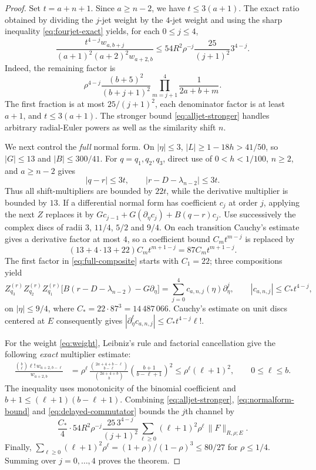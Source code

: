 \begin{proof}
Set $t=a+n+1$. Since $a\ge n-2$, we have
$t\le3(a+1)$. The exact ratio obtained by dividing the $j$-jet
weight by the $4$-jet weight and using the sharp inequality
\eqref{eq:fourjet-exact} yields, for each $0\le j\le4$,
\begin{equation}\label{eq:alljet-stronger}
 \frac{t^{4-j}w_{a,b+j}}{(a+1)^2(a+2)^2w_{a+2,b}}
 \le54R^2\rho^{-j}\frac{25}{(j+1)^2}3^{4-j}.
\end{equation}
Indeed, the remaining factor is
\[
 \rho^{4-j}\frac{(b+5)^2}{(b+j+1)^2}
 \prod_{m=j+1}^{4}\frac1{2a+b+m}.
\]
The first fraction is at most $25/(j+1)^2$, each denominator
factor is at least $a+1$, and $t\le3(a+1)$.
The stronger bound \eqref{eq:alljet-stronger} handles arbitrary
radial-Euler powers as well as the similarity shift $n$.

We next control the \emph{full} normal form. On $|\eta|\le3$,
$|L|\ge1-18h>41/50$, so $|G|\le13$ and $|B|\le300/41$.
For $q=q_1,q_2,q_3$, direct use of $0<h<1/100$,
$n\ge2$, and $a\ge n-2$ gives
\[
 |q-r|\le3t,\qquad |r-D-\lambda_{n-2}|\le3t.
\]
Thus all shift-multipliers are bounded by $22t$, while the
derivative multiplier is bounded by $13$. If a differential
normal form has coefficient $c_j$ at order $j$, applying the
next $Z$ replaces it by
$Gc_{j-1}+G(\partial_\eta c_j)+B(q-r)c_j$.
Use successively the complex discs of radii
$3$, $11/4$, $5/2$ and $9/4$.
On each transition Cauchy's estimate gives a derivative factor
at most $4$, so a coefficient bound $C_m t^{m-j}$
is replaced by
\[
 (13+4\cdot13+22)C_m t^{m+1-j}
 =87C_m t^{m+1-j}.
\]
The first factor in \eqref{eq:full-composite} starts with
$C_1=22$; three compositions yield
\begin{equation}\label{eq:normalform-bound}
 Z_{q_3}^{(r)}Z_{q_2}^{(r)}Z_{q_1}^{(r)}
 \bigl[B(r-D-\lambda_{n-2})-G\partial_\eta\bigr]
 =\sum_{j=0}^{4}c_{a,n,j}(\eta)\partial_\eta^j,\qquad
 |c_{a,n,j}|\le C_*t^{4-j},
\end{equation}
on $|\eta|\le9/4$, where
$C_*=22\cdot87^3=14\,487\,066$.
Cauchy's estimate on unit discs centered at $E$ consequently gives
$|\partial_\eta^\ell c_{a,n,j}|\le C_*t^{4-j}\ell!$.

For the weight \eqref{eq:weight}, Leibniz's rule and factorial
cancellation give the following \emph{exact} multiplier estimate:
\begin{align}
 \frac{\binom b\ell\ell!\,w_{a+2,b-\ell}}{w_{a+2,b}}
 &=\rho^\ell\,
 \frac{\binom{2a+4+b-\ell}{b-\ell}}{\binom{2a+4+b}{b}}
 \left(\frac{b+1}{b-\ell+1}\right)^2
 \le \rho^\ell(\ell+1)^2,\qquad0\le\ell\le b.
 \label{eq:delayed-commutator}
\end{align}
The inequality uses monotonicity of the binomial coefficient and
$b+1\le(\ell+1)(b-\ell+1)$. Combining
\eqref{eq:alljet-stronger}, \eqref{eq:normalform-bound} and
\eqref{eq:delayed-commutator} bounds the $j$th channel by
\[
 \frac{C_*}{4}\cdot54R^2\rho^{-j}
 \frac{25\,3^{4-j}}{(j+1)^2}
 \sum_{\ell\ge0}(\ell+1)^2\rho^\ell\,\|F\|_{R,\rho;E}.
\]
Finally,
$\sum_{\ell\ge0}(\ell+1)^2\rho^\ell
 =(1+\rho)/(1-\rho)^3\le80/27$ for $\rho\le1/4$.
Summing over $j=0,\ldots,4$ proves the theorem.
\end{proof}

